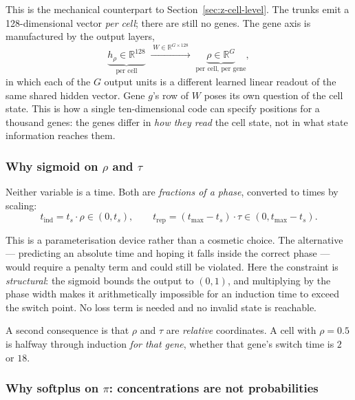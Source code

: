\documentclass[11pt,a4paper]{article}
\newcommand{\ts}{t_{s}}
\newcommand{\tmax}{t_{\max}}
\newcommand{\R}{\mathbb{R}}
\theoremstyle{definition}
\begin{document}
This is the mechanical counterpart to Section~\ref{sec:z-cell-level}. The trunks
emit a 128-dimensional vector \emph{per cell}; there are still no genes. The
gene axis is manufactured by the output layers,
%
\begin{equation}
\underbrace{h_\rho \in \R^{128}}_{\text{per cell}}
\;\xrightarrow{\;W \in \R^{G \times 128}\;}\;
\underbrace{\rho \in \R^{G}}_{\text{per cell, per gene}} ,
\end{equation}
%
in which each of the $G$ output units is a different learned linear readout of
the same shared hidden vector. Gene $g$'s row of $W$ poses its own question of
the cell state. This is how a single ten-dimensional code can specify positions
for a thousand genes: the genes differ in \emph{how they read} the cell state,
not in what state information reaches them.

\subsubsection{Why sigmoid on \texorpdfstring{$\rho$}{rho} and \texorpdfstring{$\tau$}{tau}}

Neither variable is a time. Both are \emph{fractions of a phase}, converted to
times by scaling:
%
\begin{equation}
t_{\text{ind}} = \ts \cdot \rho \in (0, \ts),
\qquad
t_{\text{rep}} = (\tmax - \ts)\cdot \tau \in (0, \tmax - \ts).
\end{equation}

This is a parameterisation device rather than a cosmetic choice. The
alternative --- predicting an absolute time and hoping it falls inside the
correct phase --- would require a penalty term and could still be violated. Here
the constraint is \emph{structural}: the sigmoid bounds the output to $(0,1)$,
and multiplying by the phase width makes it arithmetically impossible for an
induction time to exceed the switch point. No loss term is needed and no
invalid state is reachable.

A second consequence is that $\rho$ and $\tau$ are \emph{relative} coordinates.
A cell with $\rho = 0.5$ is halfway through induction \emph{for that gene},
whether that gene's switch time is $2$ or $18$.

\subsubsection{Why softplus on \texorpdfstring{$\pi$}{pi}: concentrations are not probabilities}
\end{document}
